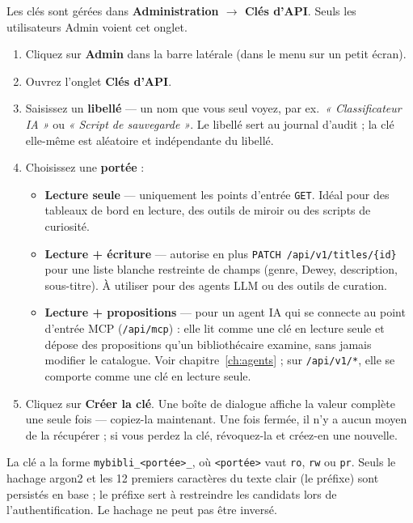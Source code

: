 Les clés sont gérées dans \textbf{Administration \(\rightarrow\)
Clés d'API}. Seuls les utilisateurs Admin voient cet onglet.

\begin{enumerate}
  \item Cliquez sur \textbf{Admin} dans la barre latérale (dans
        le menu sur un petit écran).
  \item Ouvrez l'onglet \textbf{Clés d'API}.
  \item Saisissez un \textbf{libellé} — un nom que vous seul voyez,
        par ex.\ \emph{« Classificateur IA »} ou \emph{« Script de
        sauvegarde »}. Le libellé sert au journal d'audit ; la clé
        elle-même est aléatoire et indépendante du libellé.
  \item Choisissez une \textbf{portée} :
        \begin{itemize}
          \item \textbf{Lecture seule} — uniquement les points
                d'entrée \texttt{GET}. Idéal pour des tableaux de
                bord en lecture, des outils de miroir ou des
                scripts de curiosité.
          \item \textbf{Lecture + écriture} — autorise en plus
                \texttt{PATCH /api/v1/titles/\{id\}} pour une
                liste blanche restreinte de champs (genre, Dewey,
                description, sous-titre). À utiliser pour des
                agents LLM ou des outils de curation.
          \item \textbf{Lecture + propositions} — pour un agent IA
                qui se connecte au point d'entrée MCP
                (\texttt{/api/mcp}) : elle lit comme une clé en lecture seule et dépose des
                propositions qu'un bibliothécaire examine, sans
                jamais modifier le catalogue. Voir
                chapitre~\ref{ch:agents} ; sur \texttt{/api/v1/*},
                elle se comporte comme une clé en lecture seule.
        \end{itemize}
  \item Cliquez sur \textbf{Créer la clé}. Une boîte de dialogue
        affiche la valeur complète une seule fois — copiez-la
        maintenant. Une fois fermée, il n'y a aucun moyen de la
        récupérer ; si vous perdez la clé, révoquez-la et créez-en
        une nouvelle.
\end{enumerate}

La clé a la forme \texttt{mybibli\_<portée>\_<aléa40>}, où
\texttt{<portée>} vaut \texttt{ro}, \texttt{rw} ou \texttt{pr}. Seuls le hachage
argon2 et les 12 premiers caractères du texte clair (le préfixe)
sont persistés en base ; le préfixe sert à restreindre les candidats
lors de l'authentification. Le hachage ne peut pas être inversé.

